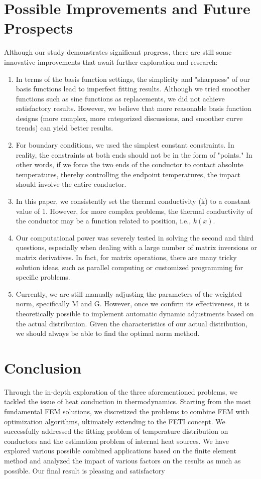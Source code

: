 \documentclass{article}
\begin{document}
\section{Possible Improvements and Future Prospects}
Although our study demonstrates significant progress, there are still some innovative improvements that await further exploration and research:
\begin{enumerate}
    \item In terms of the basis function settings, the simplicity and "sharpness" of our basis functions lead to imperfect fitting results. Although we tried smoother functions such as sine functions as replacements, we did not achieve satisfactory results. However, we believe that more reasonable basis function designs (more complex, more categorized discussions, and smoother curve trends) can yield better results.
    \item For boundary conditions, we used the simplest constant constraints. In reality, the constraints at both ends should not be in the form of "points." In other words, if we force the two ends of the conductor to contact absolute temperatures, thereby controlling the endpoint temperatures, the impact should involve the entire conductor.
    \item In this paper, we consistently set the thermal conductivity (k) to a constant value of 1. However, for more complex problems, the thermal conductivity of the conductor may be a function related to position, i.e., \(k(x)\).
    \item Our computational power was severely tested in solving the second and third questions, especially when dealing with a large number of matrix inversions or matrix derivatives. In fact, for matrix operations, there are many tricky solution ideas, such as parallel computing or customized programming for specific problems.
    \item Currently, we are still manually adjusting the parameters of the weighted norm, specifically M and G. However, once we confirm its effectiveness, it is theoretically possible to implement automatic dynamic adjustments based on the actual distribution. Given the characteristics of our actual distribution, we should always be able to find the optimal norm method.\cite{anonymous2024sophiainaudition}
\end{enumerate}

\section{Conclusion}
Through the in-depth exploration of the three aforementioned problems, we tackled the issue of heat conduction in thermodynamics. Starting from the most fundamental FEM solutions, we discretized the problems to combine FEM with optimization algorithms, ultimately extending to the FETI concept. We successfully addressed the fitting problem of temperature distribution on conductors and the estimation problem of internal heat sources. We have explored various possible combined applications based on the finite element method and analyzed the impact of various factors on the results as much as possible. Our final result is pleasing and satisfactory
\end{document}
